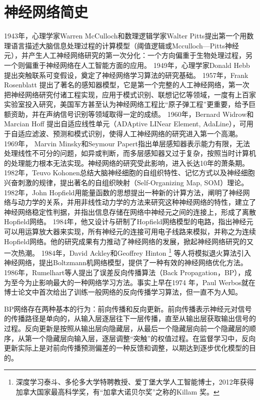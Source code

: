 \section{神经网络简史}
1943年，心理学家Warren McCulloch和数理逻辑学家Walter Pitts\cite{mcculloch1943logical}提出第一个用数理语言描述大脑信息处理过程的计算模型（阈值逻辑或Mcculloch—Pitts神经元），并产生人工神经网络研究的第一次分化：一个方向偏重于生物处理过程，另一个则偏重于神经网络在人工智能方面的应用。
1949年，心理学家Donald Hebb\cite{hebb1968the}提出突触联系可变假设，奠定了神经网络学习算法的研究基础。
1957年，Frank Rosenblatt\cite{rosenblatt1957perceptron} 提出了著名的感知器模型，它是第一个完整的人工神经网络，第一次把神经网络研究付诸工程实现，应用于模式识别、联想记忆等领域，一度有上百家实验室投入研究，美国军方甚至认为神经网络工程比“原子弹工程”更重要，给予巨额资助，并在声纳信号识别等领域取得一定的成绩。
1960年，Bernard Widrow和Marcian Hoff\cite{widrow1960adaptive} 提出自适应线性单元（ADAptive LINear Element, AdaLine），可用于自适应滤波、预测和模式识别，使得人工神经网络的研究进入第一个高潮。
1969年， Marvin Minsky和Seymour Papert\cite{minsky1969perceptron}指出单层感知器表示能力有限，无法处理线性不可分的问题，如异或判断，而多层感知器又过于复杂，按照当时计算机的处理能力根本无法实现。神经网络的研究受此影响，进入长达10年的萧条期。
1982年，Teuvo Kohonen\cite{kohonen1982self}总结大脑神经细胞的自组织特性、记忆方式以及神经细胞兴奋刺激的规律，提出著名的自组织映射（Self-Organizing Map, SOM）理论。
1982年，John Hopfield\cite{hopfield1982neural}用能量函数的思想提出一种新的计算方法，阐明了神经网络与动力学的关系，并用非线性动力学的方法来研究这种神经网络的特性，建立了神经网络稳定性判据，并指出信息存储在网络中神经元之间的连接上，形成了离散Hopfield网络。
1984年\cite{hopfield1984neurons}，他又设计与研制了Hopfield网络模型的电路，指出神经元可以用运算放大器来实现，所有神经元的连接可用电子线路来模拟，并称之为连续Hopfield网络。他的研究成果有力推动了神经网络的发展，掀起神经网络研究的又一次热潮。
1984年，David Ackley和Geoffrey Hinton
\footnote{深度学习泰斗、多伦多大学特聘教授、爱丁堡大学人工智能博士，2012年获得加拿大国家最高科学奖，有“加拿大诺贝尔奖”之称的Killam 奖。}
等人\cite{ackley1985learning}将模拟退火算法引入神经网络，提出Boltzmann机网络模型，提供了一种有效的神经网络优化方法。
1986年，Rumelhart等人\cite{rumelhart1986learning}提出了误差反向传播算法（Back Propagation，BP），成为至今为止影响最大的一种网络学习方法。事实上早在1974 年，Paul Werbos\cite{werbos1974beyond}就在博士论文中首次给出了训练一般网络的反向传播学习算法，但一直不为人知。

BP网络存在两种基本的行为：前向传播和反向更新。前向传播表示神经元对信号的传播路径是单向的，从输入层逐层往下一层传播，直至从输出层获取输出信号的过程。反向更新是按照从输出层向隐藏层，从最后一个隐藏层向前一个隐藏层的顺序，从第一个隐藏层向输入层，逐层调整“突触”的权值过程。在监督学习中，反向更新实际上是对前向传播预测偏差的一种反馈和调整，以期达到逐步优化模型的目的。

